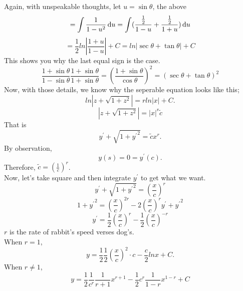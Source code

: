 \begin{example}
\[\]
Again, with unspeakable thoughts, let $u=\sin\theta$, the above
\[=\int\frac{1}{1-u^2}\,\mathrm{d} u=\int(\frac{\frac{1}{2}}{1-u}+\frac{\frac{1}{2}}{1+u})\,\mathrm{d} u
\]
\[=\frac{1}{2}ln|\frac{1+u}{1-u}|+C=ln|\sec\theta+\tan\theta|+C
\]
This shows you why the last equal sign is the case.
\[\frac{1+\sin\theta}{1-\sin\theta}\frac{1+\sin\theta}{1+\sin\theta}=(\frac{1+\sin\theta}{\cos\theta})^2=(\sec\theta+\tan\theta)^2
\]
Now, with those details, we know why the seperable equation looks like this;
\[ln|z+\sqrt{1+z^2}|=rln|x|+C
.\]
\[|z+\sqrt{1+z^2}|=|x|^r\tilde{c}
\]
That is 
\[y^\prime+\sqrt{1+{y^\prime}^2}=\tilde{c}x^r.
\]
By observation,
\[y(s)=0=y^\prime(c).
\]
Therefore, $\tilde{c}=(\frac{1}{c})^r$.\\
Now, let's take square and then integrate $y^\prime$ to get what we want.\\
\[y^\prime+\sqrt{1+{y^\prime}^2}=(\frac{x}{c})^r
\]
\[1+{y^\prime}^2=(\frac{x}{c})^{2r}-2(\frac{x}{c})^ry^\prime+{y^\prime}^2
\]
\[\boxed{y^\prime=\frac{1}{2}(\frac{x}{c})^r-\frac{1}{2}(\frac{x}{c})^{-r}}
\]
$r$ is the rate of rabbit's speed verses dog's.\\
When $r=1$,
\[y=\frac{1}{2}\frac{1}{2}(\frac{x}{c})^2\cdot c-\boxed{\frac{c}{2}lnx}+C.
\]
When $r\neq1$,
\[y=\frac{1}{2}\frac{1}{c^r}\frac{1}{r+1}x^{r+1}-\frac{1}{2}c^r\frac{1}{1-r}x^{1-r}+C
\]
\end{example}
